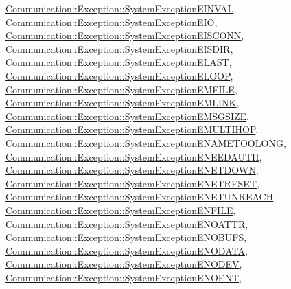 \hyperlink{class_communication_1_1_exception_1_1_system_exception_e_i_n_v_a_l}{Communication\+::\+Exception\+::\+System\+Exception\+E\+I\+N\+V\+A\+L}, \hyperlink{class_communication_1_1_exception_1_1_system_exception_e_i_o}{Communication\+::\+Exception\+::\+System\+Exception\+E\+I\+O}, \hyperlink{class_communication_1_1_exception_1_1_system_exception_e_i_s_c_o_n_n}{Communication\+::\+Exception\+::\+System\+Exception\+E\+I\+S\+C\+O\+N\+N}, \hyperlink{class_communication_1_1_exception_1_1_system_exception_e_i_s_d_i_r}{Communication\+::\+Exception\+::\+System\+Exception\+E\+I\+S\+D\+I\+R}, \hyperlink{class_communication_1_1_exception_1_1_system_exception_e_l_a_s_t}{Communication\+::\+Exception\+::\+System\+Exception\+E\+L\+A\+S\+T}, \hyperlink{class_communication_1_1_exception_1_1_system_exception_e_l_o_o_p}{Communication\+::\+Exception\+::\+System\+Exception\+E\+L\+O\+O\+P}, \hyperlink{class_communication_1_1_exception_1_1_system_exception_e_m_f_i_l_e}{Communication\+::\+Exception\+::\+System\+Exception\+E\+M\+F\+I\+L\+E}, \hyperlink{class_communication_1_1_exception_1_1_system_exception_e_m_l_i_n_k}{Communication\+::\+Exception\+::\+System\+Exception\+E\+M\+L\+I\+N\+K}, \hyperlink{class_communication_1_1_exception_1_1_system_exception_e_m_s_g_s_i_z_e}{Communication\+::\+Exception\+::\+System\+Exception\+E\+M\+S\+G\+S\+I\+Z\+E}, \hyperlink{class_communication_1_1_exception_1_1_system_exception_e_m_u_l_t_i_h_o_p}{Communication\+::\+Exception\+::\+System\+Exception\+E\+M\+U\+L\+T\+I\+H\+O\+P}, \hyperlink{class_communication_1_1_exception_1_1_system_exception_e_n_a_m_e_t_o_o_l_o_n_g}{Communication\+::\+Exception\+::\+System\+Exception\+E\+N\+A\+M\+E\+T\+O\+O\+L\+O\+N\+G}, \hyperlink{class_communication_1_1_exception_1_1_system_exception_e_n_e_e_d_a_u_t_h}{Communication\+::\+Exception\+::\+System\+Exception\+E\+N\+E\+E\+D\+A\+U\+T\+H}, \hyperlink{class_communication_1_1_exception_1_1_system_exception_e_n_e_t_d_o_w_n}{Communication\+::\+Exception\+::\+System\+Exception\+E\+N\+E\+T\+D\+O\+W\+N}, \hyperlink{class_communication_1_1_exception_1_1_system_exception_e_n_e_t_r_e_s_e_t}{Communication\+::\+Exception\+::\+System\+Exception\+E\+N\+E\+T\+R\+E\+S\+E\+T}, \hyperlink{class_communication_1_1_exception_1_1_system_exception_e_n_e_t_u_n_r_e_a_c_h}{Communication\+::\+Exception\+::\+System\+Exception\+E\+N\+E\+T\+U\+N\+R\+E\+A\+C\+H}, \hyperlink{class_communication_1_1_exception_1_1_system_exception_e_n_f_i_l_e}{Communication\+::\+Exception\+::\+System\+Exception\+E\+N\+F\+I\+L\+E}, \hyperlink{class_communication_1_1_exception_1_1_system_exception_e_n_o_a_t_t_r}{Communication\+::\+Exception\+::\+System\+Exception\+E\+N\+O\+A\+T\+T\+R}, \hyperlink{class_communication_1_1_exception_1_1_system_exception_e_n_o_b_u_f_s}{Communication\+::\+Exception\+::\+System\+Exception\+E\+N\+O\+B\+U\+F\+S}, \hyperlink{class_communication_1_1_exception_1_1_system_exception_e_n_o_d_a_t_a}{Communication\+::\+Exception\+::\+System\+Exception\+E\+N\+O\+D\+A\+T\+A}, \hyperlink{class_communication_1_1_exception_1_1_system_exception_e_n_o_d_e_v}{Communication\+::\+Exception\+::\+System\+Exception\+E\+N\+O\+D\+E\+V}, \hyperlink{class_communication_1_1_exception_1_1_system_exception_e_n_o_e_n_t}{Communication\+::\+Exception\+::\+System\+Exception\+E\+N\+O\+E\+N\+T}, 